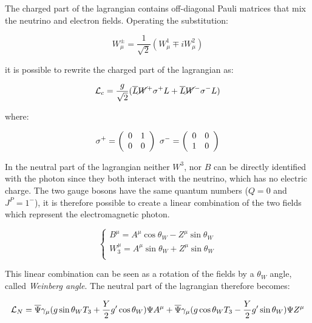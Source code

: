 The charged part of the lagrangian contains off-diagonal Pauli matrices that mix the neutrino and electron fields. Operating the substitution:

\begin{equation}
W^\pm_\mu = \frac{1}{\sqrt{2}}(W^{1}_{\mu} \mp i W^{2}_{\mu})
\label{eq:wpm_def}
\end{equation}

it is possible to rewrite the charged part of the lagrangian as:

\begin{equation}
\mathcal{L}_c = \frac{g}{\sqrt{2}}(\overline{L}\cancel{W}^{+} \sigma^{+} L +\overline{L}\cancel{W}^{-}\sigma^{-} L)
\end{equation}

where:

\begin{equation}
\sigma^+ = \left(\begin{array}{cc}0 & 1 \\0 & 0\end{array}\right)\,\, \sigma^- = \left(\begin{array}{cc}0 & 0 \\1 & 0\end{array}\right)
\end{equation}

In the neutral part of the lagrangian neither $W^3$, nor $B$ can be directly identified with the photon since they both interact with the neutrino, which has no electric charge. The two gauge bosons have the same quantum numbers ($Q = 0$ and $J^P = 1^-$), it is therefore possible to create a linear combination of the two fields which represent the electromagnetic photon.

\begin{equation}
\left\{\begin{matrix}
B^{\mu}=A^{\mu}\operatorname{cos}\theta_{W}-Z^{\mu}\operatorname{sin}\theta_{W}\\ 

W^{\mu}_3=A^{\mu}\operatorname{sin}\theta_{W}+Z^{\mu}\operatorname{sin}\theta_{W}\\ 
\end{matrix}\right.
\label{eq:su2_rotation}
\end{equation}

This linear combination can be seen as a rotation of the fields by a $\theta_W$ angle, called \emph{Weinberg angle}. 
The neutral part of the lagrangian therefore becomes:
 
\begin{equation}
\mathcal{L}_{N}=\overline{\Psi}\gamma_{\mu}(g\operatorname{sin}\theta_{W}T_3+ \frac{Y}{2}g'\operatorname{cos}\theta_{W})\Psi A^{\mu}+\overline{\Psi}\gamma_{\mu}(g\operatorname{cos}\theta_{W}T_3- \frac{Y}{2}g'\operatorname{sin}\theta_{W})\Psi Z^{\mu}
\end{equation}

